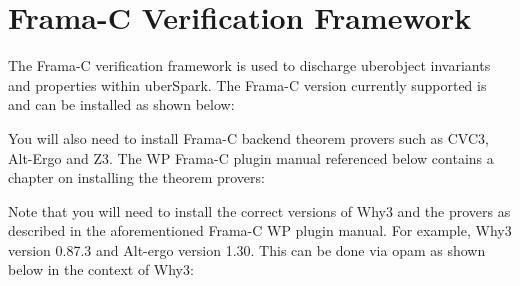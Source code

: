 \documentclass[letterpaper,10pt,english]{sphinxmanual}
\begin{document}
\section{Frama-C Verification Framework}
\label{\detokenize{sw-requirements:frama-c-verification-framework}}
The Frama-C verification framework is used to discharge uberobject invariants and
properties within uberSpark. The Frama-C version currently supported is
 and can be installed as shown below:

\begin{sphinxVerbatim}[commandchars=\\\{\}]
 
  
 
  
 
\end{sphinxVerbatim}

You will also need to install Frama-C backend theorem provers such as
CVC3, Alt-Ergo and Z3. The WP Frama-C plugin manual referenced below
contains a chapter on installing the theorem provers:

\begin{sphinxVerbatim}[commandchars=\\\{\}]
\end{sphinxVerbatim}

Note that you will need to install the correct versions of Why3 and the
provers as described in the aforementioned Frama-C WP plugin manual.
For example,  Why3 version 0.87.3 and Alt-ergo version 1.30. This can be
done via opam as shown below in the context of Why3:

\begin{sphinxVerbatim}[commandchars=\\\{\}]
  
\end{sphinxVerbatim}
\end{document}
